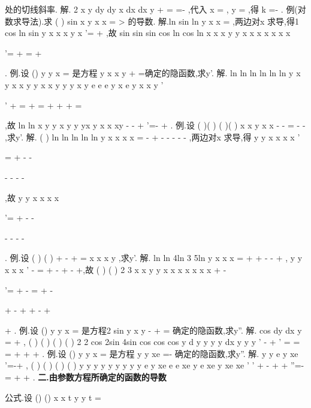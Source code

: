 处的切线斜率. 
解. 2
x
y dy
dy
x
dx
dx
y
+
\cdots 
=
\Rightarrow 
=-
\cdots 
,代入
x =
,
y =
,得
k =-
. 
\textcolor{lyred}{例(对数求导法)}.求
(
)
sin
x
y
x
x
=
>
的导数. 
解.ln
sin
ln
y
x
x
=
\cdots 
,两边对x 求导,得1
cos
ln
sin
y
x
x
x
y
x
'=
\cdots 
+
\cdots 
,故 
sin
sin
sin
cos
ln
cos
ln
x
x
x
y
y
x
x
x
x
x
x
x




'=
\cdots 
+
=
\cdots 
+








. 
\textcolor{lyred}{例}.设
()
y
y x
=
是方程
y
x
x
y
+
=确定的隐函数,求y'. 
解.
ln
ln
ln
ln
ln
ln
y
x
y
x
x
y
y
x
x
y
y
y
x
y
e
e
e
y
x
e
y
x
x
y
'




'
+
=\Leftrightarrow 
+
=\Rightarrow 
+
+
+
\cdots 
=








,故 
ln
ln
x
y
y
x
y
y
yx
y
x
x
xy
-
-
+
'=-
+
. 
\textcolor{lyred}{例}.设
(
)(
)
(
)(
)
x
x
y
x
x
-
-
=
-
-
,求y'. 
解.
(
)
ln
ln
ln
ln
ln
y
x
x
x
x
=
-
+
-
-
-
-
-
,两边对x 求导,得 
y
y
x
x
x
x
'


=
+
-
-


-
-
-
-


,故
y
y
x
x
x
x


'=
+
-
-


-
-
-
-


. 
\textcolor{lyred}{例}.设
(
)
(
)
+
-
+
=
x
x
x
y
,求y'. 
解.
ln
ln
4ln 3
5ln
y
x
x
x
=
+
+
-
-
+
,
y
y
x
x
x
'
-
=
\cdots 
+
-
+
-
+,故 
(
)
(
)
2 3
x
x
y
y
x
x
x
x
x
x
x
+
-




'=
+
-
=
+
-




+
-
+
+
-
+




+
. 
\textcolor{lyred}{例}.设
()
y
y x
=
是方程2
sin
y
x
y
-
+
=
确定的隐函数,求y''. 
解.
cos
dy
dx
y
=
+
,
(
)
(
)
(
)
(
)
2 2
cos
2sin
4sin
cos
cos
cos
y
d y
y y
y
dx
y
y
y
'
-
+
'
\cdots 
=
=
=
+
+
+
. 
\textcolor{lyred}{例}.设
()
y
y x
=
是方程
y
y
xe
=-
确定的隐函数,求y''. 
解.
y
y
e
y
xe
'=-+
,
(
)
(
)
(
)
(
)
y
y
y
y
y
y
y
y
y
e
y
xe
e
e
xe
y
e
xe
y
xe
xe
'
'
\cdots 
+
-
+
\cdots 
+
''=-
=
+
+
. 
\vspace{4pt}
{\bfseries \textcolor{lyred}{二.由参数方程所确定的函数的导数}}

\textcolor{lyred}{公式}.设
()
()
x
x t
y
y t
=

